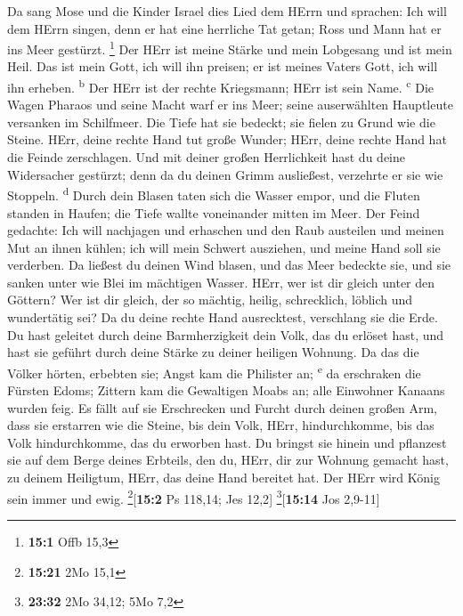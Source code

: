  Da sang Mose und die Kinder Israel dies Lied dem HErrn
und sprachen: Ich will dem HErrn singen, denn er hat eine herrliche Tat
getan; Ross und Mann hat er ins Meer gestürzt. \footnote{\textbf{15:1}
  Offb 15,3}  Der HErr ist meine Stärke und mein Lobgesang
und ist mein Heil. Das ist mein Gott, ich will ihn preisen; er ist
meines Vaters Gott, ich will ihn erheben. \textsuperscript{b}
 Der HErr ist der rechte Kriegsmann; HErr ist sein Name.
\textsuperscript{c}  Die Wagen Pharaos und seine Macht
warf er ins Meer; seine auserwählten Hauptleute versanken im Schilfmeer.
 Die Tiefe hat sie bedeckt; sie fielen zu Grund wie die
Steine.  HErr, deine rechte Hand tut große Wunder; HErr,
deine rechte Hand hat die Feinde zerschlagen.  Und mit
deiner großen Herrlichkeit hast du deine Widersacher gestürzt; denn da
du deinen Grimm ausließest, verzehrte er sie wie Stoppeln.
\textsuperscript{d}  Durch dein Blasen taten sich die
Wasser empor, und die Fluten standen in Haufen; die Tiefe wallte
voneinander mitten im Meer.  Der Feind gedachte: Ich will
nachjagen und erhaschen und den Raub austeilen und meinen Mut an ihnen
kühlen; ich will mein Schwert ausziehen, und meine Hand soll sie
verderben.  Da ließest du deinen Wind blasen, und das
Meer bedeckte sie, und sie sanken unter wie Blei im mächtigen Wasser.
 HErr, wer ist dir gleich unter den Göttern? Wer ist dir
gleich, der so mächtig, heilig, schrecklich, löblich und wundertätig
sei?  Da du deine rechte Hand ausrecktest, verschlang sie
die Erde.  Du hast geleitet durch deine Barmherzigkeit
dein Volk, das du erlöset hast, und hast sie geführt durch deine Stärke
zu deiner heiligen Wohnung.  Da das die Völker hörten,
erbebten sie; Angst kam die Philister an; \textsuperscript{e}
 da erschraken die Fürsten Edoms; Zittern kam die
Gewaltigen Moabs an; alle Einwohner Kanaans wurden feig. 
Es fällt auf sie Erschrecken und Furcht durch deinen großen Arm, dass
sie erstarren wie die Steine, bis dein Volk, HErr, hindurchkomme, bis
das Volk hindurchkomme, das du erworben hast.  Du bringst
sie hinein und pflanzest sie auf dem Berge deines Erbteils, den du,
HErr, dir zur Wohnung gemacht hast, zu deinem Heiligtum, HErr, das deine
Hand bereitet hat.  Der HErr wird König sein immer und
ewig. \footnote{\textbf{15:21} 2Mo 15,1}{[}\textbf{15:2} Ps 118,14; Jes
12,2{]} \footnote{\textbf{23:32} 2Mo 34,12; 5Mo 7,2}{[}\textbf{15:14}
Jos 2,9-11{]}

